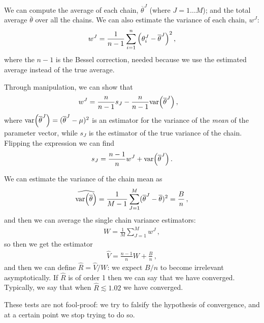 \documentclass[main.tex]{subfiles}
\begin{document}
We can compute the average of each chain, \(\overline{\theta}^{J}\) (where \(J = 1 \dots M\)); and the total average \(\overline{\theta}\) over all the chains. 
We can also estimate the variance of each chain, \(w^{J}\): 
%
\begin{align}
w^{J} = \frac{1}{n-1} \sum_{i=1}^{n} \qty(\theta^{J}_{i} - \overline{\theta}^{J})^2
\,,
\end{align}
%
where the \(n-1\) is the Bessel correction, needed because we use the estimated average instead of the true average. 

Through manipulation, we can show that 
%
\begin{align}
w^{J} &= \frac{n}{n-1} s_J - \frac{n}{n-1} \text{var} \qty(\overline{\theta}^{J})
\,,
\end{align}
%
where \(\text{var} \qty(\overline{\theta}^J) = (\overline{\theta}^{J} - \mu )^2\) is an estimator for the variance of the \emph{mean} of the parameter vector, while \(s_J\) is the estimator of the true variance of the chain. 
Flipping the expression we can find 
%
\begin{align}
s_J = \frac{n-1}{n} w^{J} + \text{var} \qty(\overline{\theta}^{J})
\,.
\end{align}

We can estimate the variance of the chain mean as 
%
\begin{align}
\widehat{\text{var} \qty(\overline{\theta})} = \frac{1}{M-1} \sum _{J=1}^{M} (\overline{\theta}^{J}- \overline{\theta})^2 = \frac{B}{n}
\,,
\end{align}
%
and then we can average the single chain variance estimators: 
%
\begin{align}
W = \frac{1}{M} \sum _{J=1}^{M} w^{J}
\,,
\end{align}
%
so then we get the estimator 
%
\begin{align}
\hat{V} = \frac{n-1}{n} W + \frac{B}{n}
\,,
\end{align}
%
and then we can define \(\hat{R} = \hat{V} / W\): we expect \(B/n\) to become irrelevant asymptotically. 
If \(\hat{R}\) is of order 1 then we can say that we have converged. 
Typically, we say that when \(\hat{R} \lesssim \num{1.02}\) we have converged. 


These tests are not fool-proof: we try to falsify the hypothesis of convergence, and at a certain point we stop trying to do so. 
\end{document}
